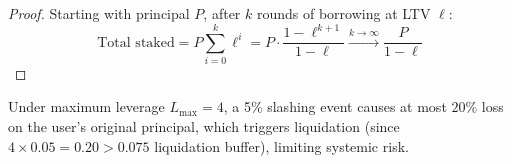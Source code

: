 \begin{proof}
Starting with principal $P$, after $k$ rounds of borrowing at LTV $\ell$:
\begin{equation}
    \text{Total staked} = P \sum_{i=0}^{k} \ell^i = P \cdot \frac{1 - \ell^{k+1}}{1 - \ell} \xrightarrow{k \to \infty} \frac{P}{1 - \ell}
\end{equation}
\end{proof}

\begin{proposition}
Under maximum leverage $L_{\max} = 4$, a 5\% slashing event causes at most $20\%$ loss on the user's original principal, which triggers liquidation (since $4 \times 0.05 = 0.20 > 0.075$ liquidation buffer), limiting systemic risk.
\end{proposition}

